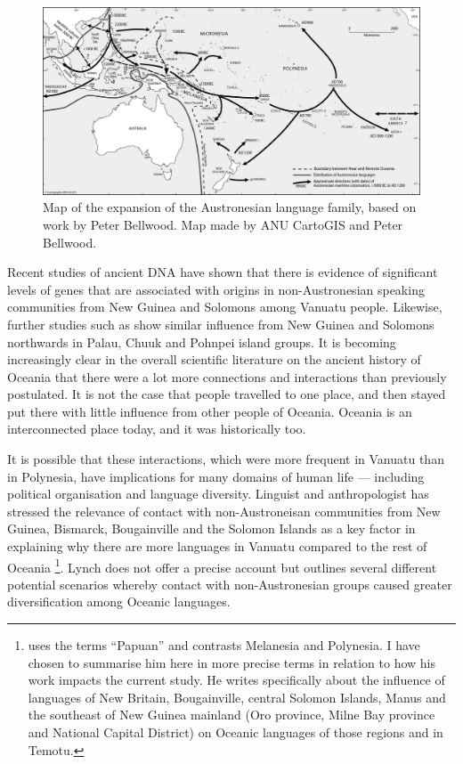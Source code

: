 \documentclass[a4paper,10pt]{article} %
\begin{document}
\begin{figure}[ht]
\centering
\includegraphics[width=15cm]{ANU_cartography.jpg}
\caption{Map of the expansion of the Austronesian language family, based on work by Peter Bellwood. Map made by ANU CartoGIS and Peter Bellwood.}
\label{austro_expansion_bellwood}
\end{figure}

Recent studies of ancient DNA \citep{lipson_harvad_ancient_dna_vanuatu_2018, posth_jena_ancient_dna_vanuatu_2018} have shown that there is evidence of significant levels of genes that are associated with origins in non-Austronesian speaking communities from New Guinea and Solomons among Vanuatu people. Likewise, further studies such as \citet{liu2022ancient} show similar influence from New Guinea and Solomons northwards in Palau, Chuuk and Pohnpei island groups. It is becoming increasingly clear in the overall scientific literature on the ancient history of Oceania that there were a lot more connections and interactions than previously postulated. It is not the case that people travelled to one place, and then stayed put there with little influence from other people of Oceania. Oceania is an interconnected place today, and it was historically too.

It is possible that these interactions, which were more frequent in Vanuatu than in Polynesia, have implications for many domains of human life --- including political organisation and language diversity. Linguist and anthropologist \citet[104]{lynch1981melanesian} has stressed the relevance of contact with non-Austroneisan communities from New Guinea, Bismarck, Bougainville and the Solomon Islands as a key factor in explaining why there are more languages in Vanuatu compared to the rest of Oceania \footnote{\citet{lynch1981melanesian} uses the terms ``Papuan'' and contrasts Melanesia and Polynesia. I have chosen to summarise him here in more precise terms in relation to how his work impacts the current study. He writes specifically about the influence of languages of New Britain, Bougainville, central Solomon Islands, Manus and the southeast of New Guinea mainland (Oro province, Milne Bay province and National Capital District) on Oceanic languages of those regions and in Temotu.}. Lynch does not offer a precise account but outlines several different potential scenarios whereby contact with non-Austronesian groups caused greater diversification among Oceanic languages.
\end{document}

